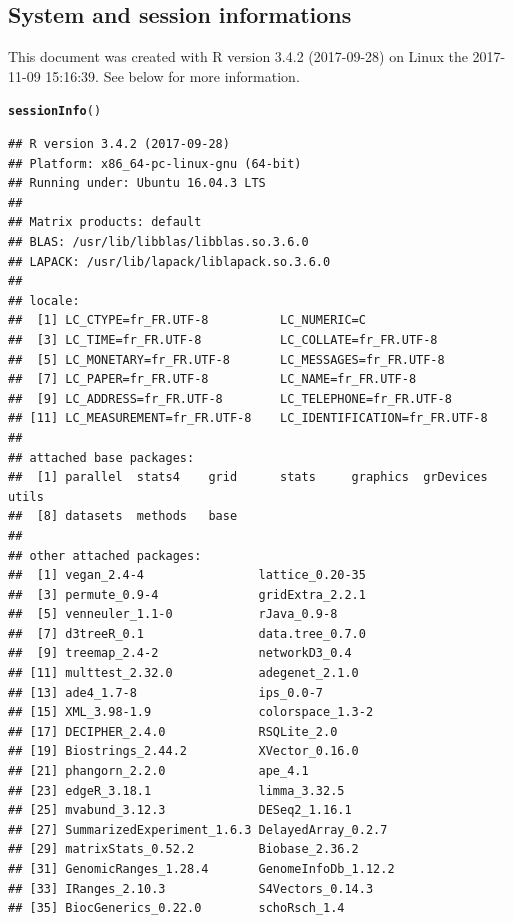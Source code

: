 \documentclass[12pt]{article}\usepackage[]{graphicx}\usepackage[]{color}
\makeatletter
\newcommand{\hlstd}[1]{\textcolor[rgb]{0.345,0.345,0.345}{#1}}%
\newcommand{\hlkwd}[1]{\textcolor[rgb]{0.737,0.353,0.396}{\textbf{#1}}}%
\newenvironment{kframe}{%
 \def\at@end@of@kframe{}%
 \ifinner\ifhmode%
  \def\at@end@of@kframe{\end{minipage}}%
  \begin{minipage}{\columnwidth}%
 \fi\fi%
 \def\FrameCommand##1{\hskip\@totalleftmargin \hskip-\fboxsep
 \colorbox{shadecolor}{##1}\hskip-\fboxsep
     \hskip-\linewidth \hskip-\@totalleftmargin \hskip\columnwidth}%
 \MakeFramed {\advance\hsize-\width
   \@totalleftmargin\z@ \linewidth\hsize
   \@setminipage}}%
 {\par\unskip\endMakeFramed%
 \at@end@of@kframe}
\newenvironment{knitrout}{}{} %
\numberwithin{figure}{section}
\makeatother
\begin{document}
  \subsection{System and session informations}
  This document was created with R version 3.4.2 (2017-09-28) on Linux the 2017-11-09 15:16:39. See below for more information.
\begin{knitrout}\tiny
{}\color{fgcolor}\begin{kframe}
\begin{alltt}
\hlkwd{sessionInfo}\hlstd{()}
\end{alltt}
\begin{verbatim}
## R version 3.4.2 (2017-09-28)
## Platform: x86_64-pc-linux-gnu (64-bit)
## Running under: Ubuntu 16.04.3 LTS
## 
## Matrix products: default
## BLAS: /usr/lib/libblas/libblas.so.3.6.0
## LAPACK: /usr/lib/lapack/liblapack.so.3.6.0
## 
## locale:
##  [1] LC_CTYPE=fr_FR.UTF-8          LC_NUMERIC=C                 
##  [3] LC_TIME=fr_FR.UTF-8           LC_COLLATE=fr_FR.UTF-8       
##  [5] LC_MONETARY=fr_FR.UTF-8       LC_MESSAGES=fr_FR.UTF-8      
##  [7] LC_PAPER=fr_FR.UTF-8          LC_NAME=fr_FR.UTF-8          
##  [9] LC_ADDRESS=fr_FR.UTF-8        LC_TELEPHONE=fr_FR.UTF-8     
## [11] LC_MEASUREMENT=fr_FR.UTF-8    LC_IDENTIFICATION=fr_FR.UTF-8
## 
## attached base packages:
##  [1] parallel  stats4    grid      stats     graphics  grDevices utils    
##  [8] datasets  methods   base     
## 
## other attached packages:
##  [1] vegan_2.4-4                lattice_0.20-35           
##  [3] permute_0.9-4              gridExtra_2.2.1           
##  [5] venneuler_1.1-0            rJava_0.9-8               
##  [7] d3treeR_0.1                data.tree_0.7.0           
##  [9] treemap_2.4-2              networkD3_0.4             
## [11] multtest_2.32.0            adegenet_2.1.0            
## [13] ade4_1.7-8                 ips_0.0-7                 
## [15] XML_3.98-1.9               colorspace_1.3-2          
## [17] DECIPHER_2.4.0             RSQLite_2.0               
## [19] Biostrings_2.44.2          XVector_0.16.0            
## [21] phangorn_2.2.0             ape_4.1                   
## [23] edgeR_3.18.1               limma_3.32.5              
## [25] mvabund_3.12.3             DESeq2_1.16.1             
## [27] SummarizedExperiment_1.6.3 DelayedArray_0.2.7        
## [29] matrixStats_0.52.2         Biobase_2.36.2            
## [31] GenomicRanges_1.28.4       GenomeInfoDb_1.12.2       
## [33] IRanges_2.10.3             S4Vectors_0.14.3          
## [35] BiocGenerics_0.22.0        schoRsch_1.4              

\end{verbatim}
\end{kframe}
\end{knitrout}
\end{document}
